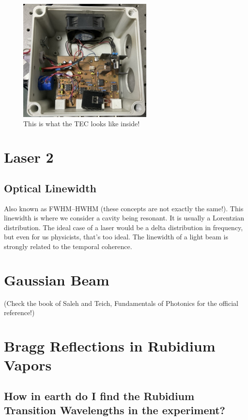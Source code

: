 \documentclass[10pt]{article}
\begin{document}
\begin{figure}[h]
    \centering
    \includegraphics[width=0.6\textwidth]{img/Image (1).jpeg}
    \caption{This is what the TEC looks like inside!}
    \label{fig:tec}
\end{figure}

\section*{Laser 2}

\subsection*{Optical Linewidth}
Also known as FWHM--HWHM (these concepts are not exactly the same!). This linewidth is where we consider a cavity being resonant. It is usually a Lorentzian distribution.
The ideal case of a laser would be a delta distribution in frequency, but even for us physicists, that's too ideal.
The linewidth of a light beam is strongly related to the temporal coherence.


\section*{Gaussian Beam}
(Check the book of Saleh and Teich, Fundamentals of Photonics for the official reference!)

\section*{Bragg Reflections in Rubidium Vapors}

\subsection*{How in earth do I find the Rubidium Transition Wavelengths in the experiment?}
\end{document}
